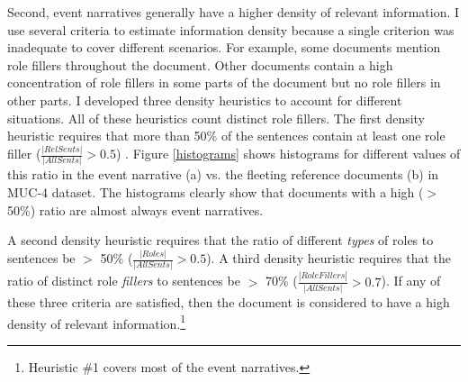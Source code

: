 Second, event narratives generally have a  higher
density of relevant information.
I use several criteria to estimate information density
because a single criterion was inadequate to cover different
scenarios. 
For example, some documents mention role fillers 
throughout the document. 
Other documents contain a high concentration of role fillers in some parts 
of the document but no role fillers in other parts.
I developed three
density heuristics to account for different situations.  
All of these heuristics count distinct role fillers.
The first density
heuristic requires that more than 50\% of the sentences contain at least one role
filler
($\frac
{|RelSents|} {|AllSents|} > 0.5$)
.  Figure 
\ref{histograms} 
shows
histograms for different values of this ratio in the event narrative
(a) vs. the fleeting reference documents
(b) in MUC-4 dataset. %
The histograms clearly show that documents with a high ($>$ 50\%)
ratio are almost always event narratives. %



A second density heuristic requires that the ratio of different {\it types}
of roles to sentences be $>$ 50\% ($\frac {|Roles|}
{|AllSents|} > 0.5$). A third density heuristic requires that the
ratio of distinct role {\it fillers} to sentences be $>$ 70\% ($\frac
{|RoleFillers|} {|AllSents|} > 0.7$). 
If
any of these three criteria are satisfied, then the document is
considered to have a high density of relevant information.\footnote{Heuristic \#1 covers most of the  event narratives.}



